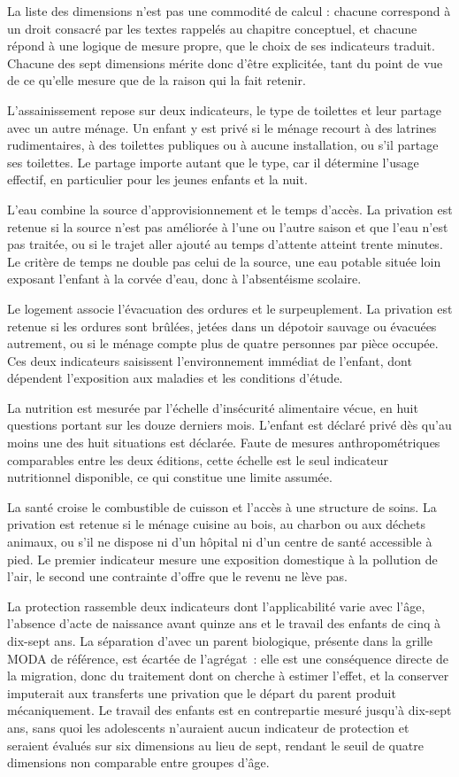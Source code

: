 La liste des dimensions n'est pas une commodité de calcul : chacune
correspond à un droit consacré par les textes rappelés au chapitre
conceptuel, et chacune répond à une logique de mesure propre, que le choix
de ses indicateurs traduit. Chacune des sept dimensions mérite donc d'être
explicitée, tant du point de vue de
ce qu'elle mesure que de la raison qui la fait retenir.

L'assainissement repose sur deux indicateurs, le type de toilettes et
leur partage avec un autre ménage. Un enfant y est privé si le ménage recourt à
des latrines rudimentaires, à des toilettes publiques ou à aucune installation,
ou s'il partage ses toilettes. Le partage importe autant que le type, car il
détermine l'usage effectif, en particulier pour les jeunes enfants et la nuit.

L'eau combine la source d'approvisionnement et le temps d'accès. La
privation est retenue si la source n'est pas améliorée à l'une ou l'autre
saison et que l'eau n'est pas traitée, ou si le trajet aller ajouté au temps
d'attente atteint trente minutes. Le critère de temps ne double pas celui de la
source, une eau potable située loin exposant l'enfant à la corvée d'eau, donc à
l'absentéisme scolaire.

Le logement associe l'évacuation des ordures et le surpeuplement. La
privation est retenue si les ordures sont brûlées, jetées dans un dépotoir
sauvage ou évacuées autrement, ou si le ménage compte plus de quatre personnes
par pièce occupée. Ces deux indicateurs saisissent l'environnement immédiat de
l'enfant, dont dépendent l'exposition aux maladies et les conditions d'étude.

La nutrition est mesurée par l'échelle d'insécurité alimentaire vécue,
en huit questions portant sur les douze derniers mois. L'enfant est déclaré
privé dès qu'au moins une des huit situations est déclarée. Faute de mesures
anthropométriques comparables entre les deux éditions, cette échelle est le seul
indicateur nutritionnel disponible, ce qui constitue une limite assumée.

La santé croise le combustible de cuisson et l'accès à une structure de
soins. La privation est retenue si le ménage cuisine au bois, au charbon ou aux
déchets animaux, ou s'il ne dispose ni d'un hôpital ni d'un centre de santé
accessible à pied. Le premier indicateur mesure une exposition domestique à la
pollution de l'air, le second une contrainte d'offre que le revenu ne lève pas.

La protection rassemble deux indicateurs dont l'applicabilité varie avec
l'âge, l'absence d'acte de naissance avant quinze ans et le travail des
enfants de cinq à dix-sept ans. La séparation d'avec un parent biologique,
présente dans la grille MODA de référence, est écartée de l'agrégat~: elle
est une conséquence directe de la migration, donc du traitement dont on
cherche à estimer l'effet, et la conserver imputerait aux transferts une
privation que le départ du parent produit mécaniquement. Le travail des
enfants est en contrepartie mesuré jusqu'à dix-sept ans, sans quoi les
adolescents n'auraient aucun indicateur de protection et seraient évalués
sur six dimensions au lieu de sept, rendant le seuil de quatre dimensions non comparable
entre groupes d'âge.

